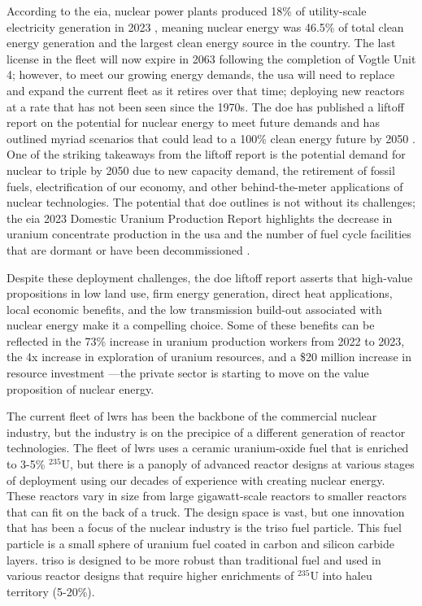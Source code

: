 According to the \gls{eia}, nuclear power plants produced 18\% of utility-scale
electricity generation in 2023 \cite{eia_elec_gen_2024}, meaning nuclear energy was 46.5\% of total clean energy generation and the largest clean energy source in the country. The last license in the fleet will now expire in 2063 following
the completion of Vogtle Unit 4; however, to meet our growing energy demands, the \gls{usa} will need to replace and expand the current fleet as it retires over that time; deploying new reactors at a rate that has not been seen since the 1970s. The \gls{doe} has published a liftoff report on the potential for
nuclear energy to meet future demands and has outlined myriad scenarios that could lead to a 100\% clean energy future by 2050
\cite{julie_liftoff_pathways_2024}. One of the striking takeaways from the
liftoff report is the potential demand for nuclear to triple by 2050 due to new
capacity demand, the retirement of fossil fuels, electrification of our
economy, and other behind-the-meter applications of nuclear technologies. The
potential that \gls{doe} outlines is not without its challenges; the \gls{eia}
2023 Domestic Uranium Production Report highlights the decrease in uranium
concentrate production in the \gls{usa} and the number of fuel cycle facilities
that are dormant or have been decommissioned \cite{eia_uranium_statistics_2023}.

Despite these deployment challenges, the \gls{doe} liftoff report asserts that
high-value propositions in low land use, firm energy generation, direct heat
applications, local economic benefits, and the low transmission build-out
associated with nuclear energy make it a compelling choice. Some of these
benefits can be reflected in the 73\% increase in uranium production workers
from 2022 to 2023, the 4x increase in exploration of uranium resources, and a
\$20 million increase in resource investment \cite{eia_uranium_statistics_2023}
---the private sector is starting to move on the value proposition of nuclear energy.

The current fleet of \glspl{lwr} has been the backbone of the commercial nuclear
industry, but the industry is on the precipice of a different generation of
reactor technologies. The fleet of \glspl{lwr} uses a ceramic uranium-oxide fuel
that is enriched to 3-5\% $^{235}$U, but there is a panoply of advanced reactor
designs at various stages of deployment using our decades of
experience with creating nuclear energy. These reactors vary in size from large
gigawatt-scale reactors to smaller reactors that can fit on the back of a
truck. The design space is vast, but one innovation that has been a focus of
the nuclear industry is the \gls{triso} fuel particle. This fuel particle is a small sphere of uranium fuel coated in carbon and silicon carbide layers. \gls{triso} is designed to be more robust than traditional fuel and used in various reactor designs that require higher enrichments of $^{235}$U into \gls{haleu} territory (5-20\%).

